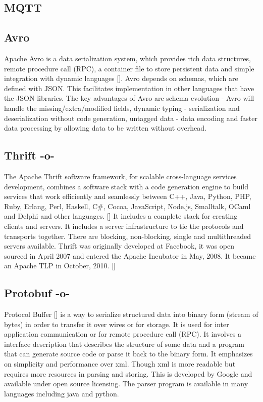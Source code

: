 \subsection{MQTT}

\subsection{Avro}

Apache Avro is a data serialization system, which provides rich data
structures, remote procedure call (RPC), a container file to store
persistent data and simple integration with dynamic
languages [\cite{www-Avro}].  Avro depends on schemas, which are defined
with JSON. This facilitates implementation in other languages that
have the JSON libraries.  The key advantages of Avro are schema
evolution - Avro will handle the missing/extra/modified fields,
dynamic typing - serialization and deserialization without code
generation, untagged data - data encoding and faster data processing
by allowing data to be written without overhead.
     
\subsection{Thrift -o-}

The Apache Thrift software framework, for scalable cross-language
services development, combines a software stack with a code generation
engine to build services that work efficiently and seamlessly between
C++, Java, Python, PHP, Ruby, Erlang, Perl, Haskell, C\#, Cocoa,
JavaScript, Node.js, Smalltalk, OCaml and Delphi and other
languages. [\cite{paper-thrift}] It includes a complete stack for
creating clients and servers. It includes a server infrastructure to
tie the protocols and transports together. There are blocking,
non-blocking, single and multithreaded servers available.  Thrift was
originally developed at Facebook, it was open sourced in April 2007
and entered the Apache Incubator in May, 2008. It became an Apache TLP
in October, 2010. [\cite{www-thrift}]
     
\subsection{Protobuf -o-}

Protocol Buffer [\cite{www-protobuf}] is a way to serialize structured
data into binary form (stream of bytes) in order to transfer it over
wires or for storage. It is used for inter application communication
or for remote procedure call (RPC). It involves a interface
description that describes the structure of some data and a program
that can generate source code or parse it back to the binary form. It
emphasizes on simplicity and performance over xml. Though xml is more
readable but requires more resources in parsing and storing.  This is
developed by Google and available under open source licensing. The
parser program is available in many languages including java and
python.

